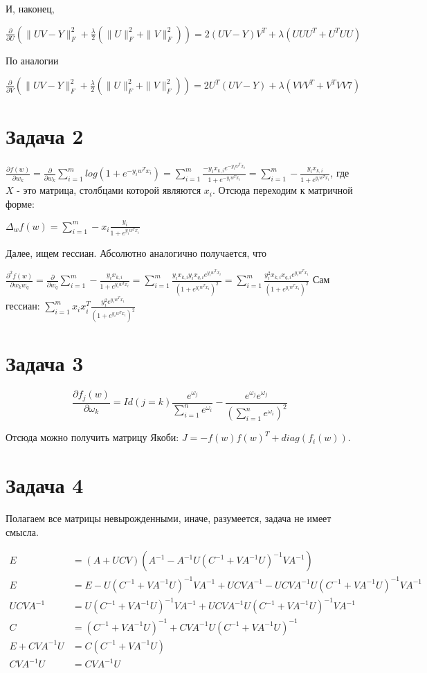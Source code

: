 \documentclass{article}
\begin{document}
И, наконец, 

$\displaystyle
\frac{\partial }{\partial U}
(\|UV - Y\|^2_F + \frac{\lambda}{2}(\|U\|^2_F + \|V\|^2_F))= 
2(UV -Y)V^T + \lambda(UUU^T + U^TUU)
$

По аналогии 

$\displaystyle
\frac{\partial }{\partial V}
(\|UV - Y\|^2_F + \frac{\lambda}{2}(\|U\|^2_F + \|V\|^2_F))= 
2U^T(UV -Y) + \lambda(VVV^T + V^TVV7)
$

\section{Задача 2}  
$\displaystyle
\frac{\partial f(w)}{\partial w_k} = 
\frac{\partial}{\partial w_k} 
\sum\limits_{i = 1}^m
log(1 + e^{-y_iw^Tx_i})
= \sum\limits_{i = 1}^m 
\frac{-y_ix_{k, i}  e^{-y_iw^Tx_i}}{1 + e^{-y_iw^Tx_i}} = 
\sum\limits_{i = 1}^m 
-\frac{y_ix_{k, i}}{1 + e^{y_iw^Tx_i}}
$,
где $X$ - это матрица, столбцами которой являются $x_i$.
Отсюда переходим к матричной форме:

$\displaystyle
\Delta_w f(w) = 
\sum\limits_{i = 1}^m 
-x_i\frac{y_i}{1 + e^{y_iw^Tx_i}}
$

Далее, ищем гессиан. Абсолютно аналогично получается, что 

$\displaystyle
\frac{\partial^2 f(w)}{\partial w_kw_q} = 
\frac{\partial}{\partial w_q} \sum\limits_{i = 1}^m 
-\frac{y_ix_{k, i}}{1 + e^{y_iw^Tx_i}} = 
\sum\limits_{i = 1}^m 
\frac{y_ix_{k, i}y_ix_{q, i}e^{y_iw^Tx_i}}{(1 + e^{y_iw^Tx_i})^2} = 
\sum\limits_{i = 1}^m 
\frac{y_i^2x_{k, i}x_{q, i}e^{y_iw^Tx_i}}{(1 + e^{y_iw^Tx_i})^2}
$
Сам гессиан:
$ \displaystyle \sum\limits_{i = 1}^m  x_i x_i^T 
\frac{y_i^2e^{y_iw^Tx_i}}{(1 + e^{y_iw^Tx_i})^2}
$

\section{Задача 3} 
$$\frac{\partial f_j(w)}{\partial \omega_k} = Id(j = k) 
\frac{e^{\omega_j}}{\sum\limits_{i=1}^n e^{\omega_i}} - 
\frac{e^{\omega_j}e^{\omega_j}}{(\sum\limits_{i=1}^n e^{\omega_i})^2} $$

Отсюда можно получить матрицу Якоби: $J = -f(w)f(w)^T + diag(f_i(w))$.
\section{Задача 4}
Полагаем все матрицы невырожденными, иначе, разумеется, задача не имеет смысла.

\begin{align*} 
	E  &= (A + UCV)(A^{-1} - A^{-1}U(C^{-1} + VA^{-1}U)^{-1}VA^{-1})\\ 
    E  &=E - U(C^{-1} + VA^{-1}U)^{-1}VA^{-1} + UCVA^{-1} - UCVA^{-1}U(C^{-1} + VA^{-1}U)^{-1}VA^{-1} \\ 
    UCVA^{-1} &= U(C^{-1} + VA^{-1}U)^{-1}VA^{-1} + UCVA^{-1}U(C^{-1} + VA^{-1}U)^{-1}VA^{-1}  \\ 
    C  &= (C^{-1} + VA^{-1}U)^{-1} + CVA^{-1}U(C^{-1} + VA^{-1}U)^{-1} \\
    E + CVA^{-1}U  &= C(C^{-1} + VA^{-1}U) \\
    CVA^{-1}U &= CVA^{-1}U
\end{align*}
\end{document}
